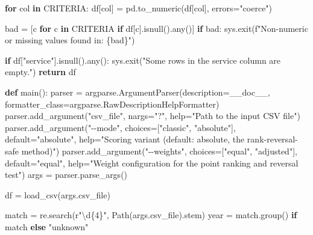\documentclass[
  12pt,
  letterpaper,
  12pt,
  oneside,
  english,
  onehalfspacing,
  headsepline]{MastersDoctoralThesis}
\newenvironment{Shaded}{\begin{snugshade}}{\end{snugshade}}
\newcommand{\BuiltInTok}[1]{\textcolor[rgb]{0.00,0.23,0.31}{#1}}
\newcommand{\ControlFlowTok}[1]{\textcolor[rgb]{0.00,0.23,0.31}{\textbf{#1}}}
\newcommand{\DecValTok}[1]{\textcolor[rgb]{0.68,0.00,0.00}{#1}}
\newcommand{\KeywordTok}[1]{\textcolor[rgb]{0.00,0.23,0.31}{\textbf{#1}}}
\newcommand{\NormalTok}[1]{\textcolor[rgb]{0.00,0.23,0.31}{#1}}
\newcommand{\OperatorTok}[1]{\textcolor[rgb]{0.37,0.37,0.37}{#1}}
\newcommand{\SpecialCharTok}[1]{\textcolor[rgb]{0.37,0.37,0.37}{#1}}
\newcommand{\SpecialStringTok}[1]{\textcolor[rgb]{0.13,0.47,0.30}{#1}}
\newcommand{\StringTok}[1]{\textcolor[rgb]{0.13,0.47,0.30}{#1}}
\newcommand{\VerbatimStringTok}[1]{\textcolor[rgb]{0.13,0.47,0.30}{#1}}
\begin{document}
\begin{Shaded}
\begin{Highlighting}[]
    \ControlFlowTok{for}\NormalTok{ col }\KeywordTok{in}\NormalTok{ CRITERIA:}
\NormalTok{        df[col] }\OperatorTok{=}\NormalTok{ pd.to\_numeric(df[col], errors}\OperatorTok{=}\StringTok{"coerce"}\NormalTok{)}

\NormalTok{    bad }\OperatorTok{=}\NormalTok{ [c }\ControlFlowTok{for}\NormalTok{ c }\KeywordTok{in}\NormalTok{ CRITERIA }\ControlFlowTok{if}\NormalTok{ df[c].isnull().}\BuiltInTok{any}\NormalTok{()]}
    \ControlFlowTok{if}\NormalTok{ bad:}
\NormalTok{        sys.exit(}\SpecialStringTok{f"Non{-}numeric or missing values found in: }\SpecialCharTok{\{}\NormalTok{bad}\SpecialCharTok{\}}\SpecialStringTok{"}\NormalTok{)}

    \ControlFlowTok{if}\NormalTok{ df[}\StringTok{"service"}\NormalTok{].isnull().}\BuiltInTok{any}\NormalTok{():}
\NormalTok{        sys.exit(}\StringTok{"Some rows in the service column are empty."}\NormalTok{)}
    \ControlFlowTok{return}\NormalTok{ df}


\KeywordTok{def}\NormalTok{ main():}
\NormalTok{    parser }\OperatorTok{=}\NormalTok{ argparse.ArgumentParser(description}\OperatorTok{=}\NormalTok{\_\_doc\_\_,}
\NormalTok{                                     formatter\_class}\OperatorTok{=}\NormalTok{argparse.RawDescriptionHelpFormatter)}
\NormalTok{    parser.add\_argument(}\StringTok{"csv\_file"}\NormalTok{, nargs}\OperatorTok{=}\StringTok{"?"}\NormalTok{, }\BuiltInTok{help}\OperatorTok{=}\StringTok{"Path to the input CSV file"}\NormalTok{)}
\NormalTok{    parser.add\_argument(}\StringTok{"{-}{-}mode"}\NormalTok{, choices}\OperatorTok{=}\NormalTok{[}\StringTok{"classic"}\NormalTok{, }\StringTok{"absolute"}\NormalTok{], default}\OperatorTok{=}\StringTok{"absolute"}\NormalTok{,}
                        \BuiltInTok{help}\OperatorTok{=}\StringTok{"Scoring variant (default: absolute, the rank{-}reversal{-}safe method)"}\NormalTok{)}
\NormalTok{    parser.add\_argument(}\StringTok{"{-}{-}weights"}\NormalTok{, choices}\OperatorTok{=}\NormalTok{[}\StringTok{"equal"}\NormalTok{, }\StringTok{"adjusted"}\NormalTok{], default}\OperatorTok{=}\StringTok{"equal"}\NormalTok{,}
                        \BuiltInTok{help}\OperatorTok{=}\StringTok{"Weight configuration for the point ranking and reversal test"}\NormalTok{)}
\NormalTok{    args }\OperatorTok{=}\NormalTok{ parser.parse\_args()}

\NormalTok{    df }\OperatorTok{=}\NormalTok{ load\_csv(args.csv\_file)}

\NormalTok{    match }\OperatorTok{=}\NormalTok{ re.search(}\VerbatimStringTok{r"}\DecValTok{\textbackslash{}d}\OperatorTok{\{4\}}\VerbatimStringTok{"}\NormalTok{, Path(args.csv\_file).stem)}
\NormalTok{    year }\OperatorTok{=}\NormalTok{ match.group() }\ControlFlowTok{if}\NormalTok{ match }\ControlFlowTok{else} \StringTok{"unknown"}


\end{Highlighting}
\end{Shaded}
\end{document}
